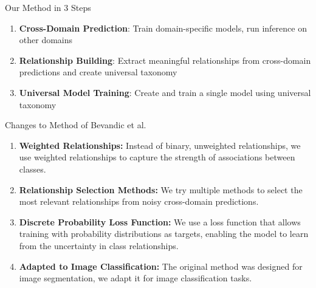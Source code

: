 \documentclass[aspectratio=169]{beamer}
\begin{document}
\begin{frame}{Our Method in 3 Steps}
    \begin{center}
    \end{center}

    \vspace{1em}

    \begin{enumerate}
        \item \textbf{Cross-Domain Prediction}: Train domain-specific models, run inference on other domains
        \item \textbf{Relationship Building}: Extract meaningful relationships from cross-domain predictions and create universal taxonomy
        \item \textbf{Universal Model Training}: Create and train a single model using universal taxonomy
    \end{enumerate}
\end{frame}

\begin{frame}{Changes to Method of Bevandic et al.}
    \begin{enumerate}
        \item \textbf{Weighted Relationships:} Instead of binary, unweighted relationships, we use weighted relationships to capture the strength of associations between classes.
        \item \textbf{Relationship Selection Methods:} We try multiple methods to select the most relevant relationships from noisy cross-domain predictions.
        \item \textbf{Discrete Probability Loss Function:} We use a loss function that allows training with probability distributions as targets, enabling the model to learn from the uncertainty in class relationships.
        \item \textbf{Adapted to Image Classification:} The original method was designed for image segmentation, we adapt it for image classification tasks.
    \end{enumerate}
\end{frame}
\end{document}

